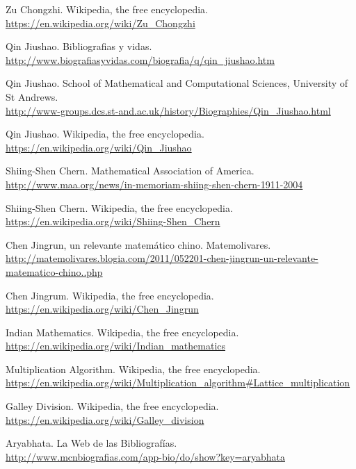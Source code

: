 \begin{thebibliography}{10}
Zu Chongzhi. Wikipedia, the free encyclopedia.\\
  \url{https://en.wikipedia.org/wiki/Zu_Chongzhi}
  
Qin Jiushao. Bibliografias y vidas.\\
  \url{http://www.biografiasyvidas.com/biografia/q/qin_jiushao.htm}

Qin Jiushao. School of Mathematical and Computational Sciences, University of St Andrews.\\
  \url{http://www-groups.dcs.st-and.ac.uk/history/Biographies/Qin_Jiushao.html}

Qin Jiushao. Wikipedia, the free encyclopedia.\\
  \url{https://en.wikipedia.org/wiki/Qin_Jiushao}

Shiing-Shen Chern. Mathematical Association of America.\\
  \url{http://www.maa.org/news/in-memoriam-shiing-shen-chern-1911-2004}

Shiing-Shen Chern. Wikipedia, the free encyclopedia.\\
  \url{https://en.wikipedia.org/wiki/Shiing-Shen_Chern}

Chen Jingrun, un relevante matemático chino. Matemolivares.\\
  \url{http://matemolivares.blogia.com/2011/052201-chen-jingrun-un-relevante-matematico-chino..php}

Chen Jingrum. Wikipedia, the free encyclopedia.\\
  \url{https://en.wikipedia.org/wiki/Chen_Jingrun}

Indian Mathematics. Wikipedia, the free encyclopedia.\\
  \url{https://en.wikipedia.org/wiki/Indian_mathematics}

Multiplication Algorithm. Wikipedia, the free encyclopedia.\\
  \url{https://en.wikipedia.org/wiki/Multiplication_algorithm#Lattice_multiplication}

Galley Division. Wikipedia, the free encyclopedia.\\
  \url{https://en.wikipedia.org/wiki/Galley_division}

Aryabhata. La Web de las Bibliografías.\\
  \url{http://www.mcnbiografias.com/app-bio/do/show?key=aryabhata}


\end{thebibliography}
